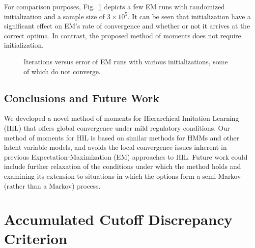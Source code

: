 For comparison purposes, Fig.\ \ref{fig:EM_error} depicts a few EM runs with randomized initialization and a sample size of $3 \times 10^5$. It can be seen that initialization have a significant effect on EM's rate of convergence and whether or not it arrives at the correct optima. In contrast, the proposed method of moments does not require initialization.
\begin{figure}
    \centering
    \caption{Iterations versus error of EM runs with various initializations, some of which do not converge.}
    \label{fig:EM_error}
\end{figure}

\section{Conclusions and Future Work}
\label{sec:conclusions}
We developed a novel method of moments for Hierarchical Imitation Learning (HIL) that offers global convergence under mild regulatory conditions.
Our method of moments for HIL is based on similar methods for HMMs and other latent variable models, and avoids the local convergence issues inherent in previous Expectation-Maximization (EM) approaches to HIL.
Future work could include further relaxation of the conditions under which the method holds and examining its extension to situations in which the options form a semi-Markov (rather than a Markov) process.

\chapter{Accumulated Cutoff Discrepancy Criterion}
